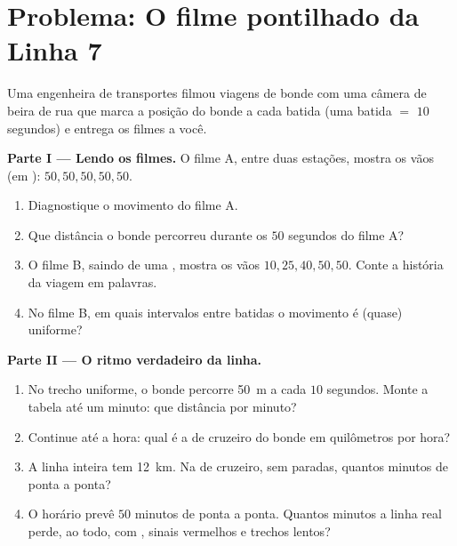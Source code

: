 \section{Problema: O filme pontilhado da Linha 7}

\begin{problem}\label{pb:g6:describing-motion:1}
Uma engenheira de transportes filmou viagens de bonde com uma câmera
de beira de rua que marca a posição do bonde a cada batida (uma
batida $=$ $10$ segundos) e entrega os filmes a você.

\medskip\noindent\textbf{Parte I --- Lendo os filmes.}
O filme A, entre duas estações, mostra os vãos (em ):
$50, 50, 50, 50, 50$.
\begin{enumerate}
  \item Diagnostique o movimento do filme A.
  \item Que distância o bonde percorreu durante os $50$ segundos do
        filme A?
  \item O filme B, saindo de uma , mostra os vãos
        $10, 25, 40, 50, 50$. Conte a história da viagem em
        palavras.
  \item No filme B, em quais intervalos entre batidas o movimento é
        (quase) uniforme?
\end{enumerate}

\medskip\noindent\textbf{Parte II --- O ritmo verdadeiro da linha.}
\begin{enumerate}[resume]
  \item No trecho uniforme, o bonde percorre \qty{50}{m} a cada $10$
        segundos. Monte a tabela até um minuto: que distância por
        minuto?
  \item Continue até a hora: qual é a  de cruzeiro do
        bonde em quilômetros por hora?
  \item A linha inteira tem \qty{12}{km}. Na  de cruzeiro,
        sem paradas, quantos minutos de ponta a ponta?
  \item O horário prevê $50$ minutos de ponta a ponta. Quantos
        minutos a linha real perde, ao todo, com , sinais
        vermelhos e trechos lentos?
\end{enumerate}


\end{problem}
